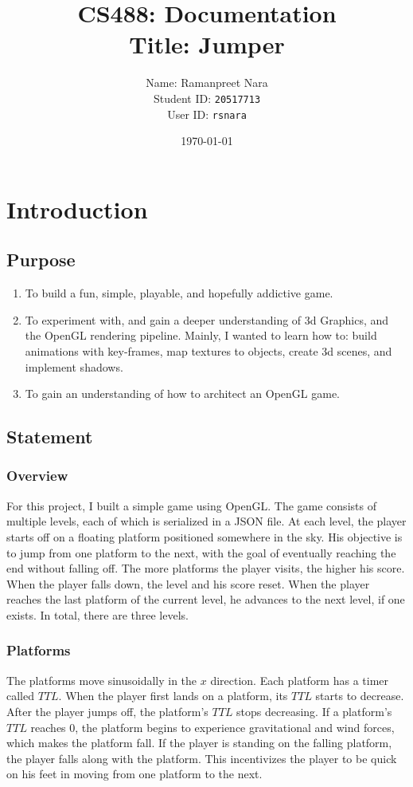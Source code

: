\documentclass[11pt]{report}
\title{CS488: Documentation \\ \small{Title:  Jumper}}
\date{\today}
\author{Name: Ramanpreet Nara \\ Student ID: \texttt{20517713} \\ User ID: \texttt{rsnara}}
\begin{document}
\maketitle
\tableofcontents
\listoffigures

\lstlistoflistings

\chapter{Introduction}
\section{Purpose}
\begin{enumerate}
\item To build a fun, simple, playable, and hopefully addictive game.
\item To experiment with, and gain a deeper understanding of 3d Graphics, and the OpenGL rendering pipeline. Mainly, I wanted to learn how to: build animations with key-frames, map textures to objects, create 3d scenes, and implement shadows.
\item To gain an understanding of how to architect an OpenGL game.
\end{enumerate}
\section{Statement}
\subsection{Overview}
For this project, I built a simple game using OpenGL. The game consists of multiple levels, each of which is serialized in a JSON file. At each level, the player starts off on a floating platform positioned somewhere in the sky. His objective is to jump from one platform to the next, with the goal of eventually reaching the end without falling off. The more platforms the player visits, the higher his score. When the player falls down, the level and his score reset. When the player reaches the last platform of the current level, he advances to the next level, if one exists. In total, there are three levels.

\subsection{Platforms}
The platforms move sinusoidally in the $x$ direction. Each platform has a timer called $TTL$. When the player first lands on a platform, its $TTL$ starts to decrease. After the player jumps off, the platform's $TTL$ stops decreasing. If a platform's $TTL$ reaches 0, the platform begins to experience gravitational and wind forces, which makes the platform fall. If the player is standing on the falling platform, the player falls along with the platform. This incentivizes the player to be quick on his feet in moving from one platform to the next.
\end{document}
